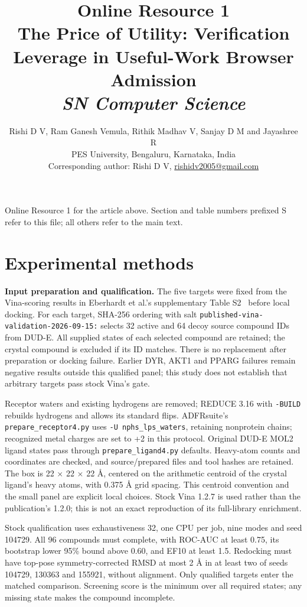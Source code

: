 \documentclass[11pt]{article}
\title{Online Resource 1\\[4pt]\large The Price of Utility: Verification Leverage in Useful-Work Browser Admission\\[4pt]\normalsize\textit{SN Computer Science}}
\author{Rishi D V, Ram Ganesh Vemula, Rithik Madhav V, Sanjay D M and Jayashree R\\[4pt]\small PES University, Bengaluru, Karnataka, India\\\small Corresponding author: Rishi D V, \href{mailto:rishidv2005@gmail.com}{rishidv2005@gmail.com}}
\date{}
\begin{document}
\maketitle

Online Resource 1 for the article above. Section and table numbers prefixed S refer to this file; all others refer to the main text.

\section{Experimental methods}

\textbf{Input preparation and qualification.} The five targets were fixed from the Vina-scoring results in Eberhardt et al.'s supplementary Table S2~\citep{Eberhardt21} before local docking. For each target, SHA-256 ordering with salt \texttt{published-vina-validation-2026-09-15:} selects 32 active and 64 decoy source compound IDs from DUD-E. All supplied states of each selected compound are retained; the crystal compound is excluded if its ID matches. There is no replacement after preparation or docking failure. Earlier DYR, AKT1 and PPARG failures remain negative results outside this qualified panel; this study does not establish that arbitrary targets pass stock Vina's gate.

Receptor waters and existing hydrogens are removed; REDUCE 3.16 with \texttt{-BUILD} rebuilds hydrogens and allows its standard flips. ADFRsuite's \texttt{prepare\_receptor4.py} uses \texttt{-U nphs\_lps\_waters}, retaining nonprotein chains; recognized metal charges are set to +2 in this protocol. Original DUD-E MOL2 ligand states pass through \texttt{prepare\_ligand4.py} defaults. Heavy-atom counts and coordinates are checked, and source/prepared files and tool hashes are retained. The box is 22 $\times$ 22 $\times$ 22 \AA{}, centered on the arithmetic centroid of the crystal ligand's heavy atoms, with 0.375 \AA{} grid spacing. This centroid convention and the small panel are explicit local choices. Stock Vina 1.2.7 is used rather than the publication's 1.2.0; this is not an exact reproduction of its full-library enrichment.

Stock qualification uses exhaustiveness 32, one CPU per job, nine modes and seed 104729. All 96 compounds must complete, with ROC-AUC at least 0.75, its bootstrap lower 95\% bound above 0.60, and EF10 at least 1.5. Redocking must have top-pose symmetry-corrected RMSD at most 2 \AA{} in at least two of seeds 104729, 130363 and 155921, without alignment. Only qualified targets enter the matched comparison. Screening score is the minimum over all required states; any missing state makes the compound incomplete.
\end{document}
